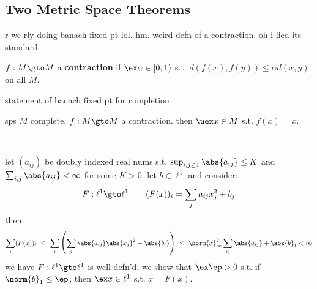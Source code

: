 \subsection{Two Metric Space Theorems}
r we rly doing banach fixed pt lol.
hm. weird defn of a contraction. oh i lied its standard
\begin{defn}
	$f:M\gto M$ a \textbf{contraction} if $\ex\alpha\in[0,1)$ s.t.
	$d(f(x),f(y))\leq\alpha d(x,y)$ on all $M$.
\end{defn}

statement of banach fixed pt for completion
\begin{thm}[title=Banach Fixed-Point Theorem]
	sps $M$ complete, $f:M\gto M$ a contraction.
	then $\uex x\in M$ s.t. $f(x)=x$.
\end{thm} \

\begin{xmp}[source=Primary Source Material]
	let $(a_{ij})$ be doubly indexed real nums s.t.
	$\sup_{i,j\geq1}\abs{a_{ij}}\leq K$ and $\sum_{i,j}\abs{a_{ij}}<\infty$
	for some $K>0$. let $b\in\ell^{1}$ and consider:
	\begin{equation*}
		F:\ell^{1}\gto \ell^{1} \qquad (F(x))_{i}=\sum_{j}a_{ij}x_{j}^{2}+b_{j}
	\end{equation*}
	then:
	\begin{equation*}
		\sum_{i}(F(x))_{i}
		\ \leq \ \sum_{i}\left(\sum_{j}\abs{a_{ij}}\abs{x_{j}}^{2}+\abs{b_{i}}\right)
		\ \leq \ \norm{x}_{\infty}^{2}\sum_{ij}\abs{a_{ij}}+\abs{b}_{1}<\infty
	\end{equation*}
	we have $F:\ell^{1}\gto\ell^{1}$ is well-defn'd.
	we show that $\ex\ep>0$ s.t. if $\norm{b}_{1}\leq\ep$, then
	$\ex x\in\ell^{1}$ s.t. $x=F(x)$.


\end{xmp}
